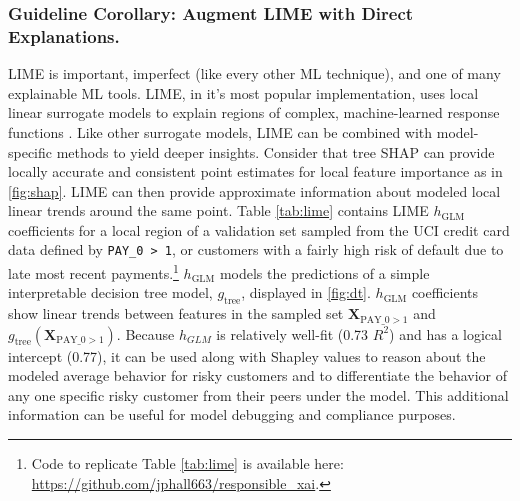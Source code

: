 \documentclass[fleqn]{article}
\begin{document}
\subsubsection{Guideline Corollary: Augment LIME with Direct Explanations.} LIME is important, imperfect (like every other ML technique), and one of many explainable ML tools. LIME, in it's most popular implementation, uses local linear surrogate models to explain regions of complex, machine-learned response functions \cite{lime}. Like other surrogate models, LIME can be combined with model-specific methods to yield deeper insights. Consider that tree SHAP can provide locally accurate and consistent point estimates for local feature importance as in \ref{fig:shap}. LIME can then provide approximate information about modeled local linear trends around the same point. Table \ref{tab:lime} contains LIME $h_{\text{GLM}}$ coefficients for a local region of a validation set sampled from the UCI credit card data defined by \texttt{PAY\_0 > 1}, or customers with a fairly high risk of default due to late most recent payments.\footnote{Code to replicate Table \ref{tab:lime} is available here: \url{https://github.com/jphall663/responsible_xai}.} $h_{\text{GLM}}$ models the predictions of a simple interpretable decision tree model, $g_{\text{tree}}$, displayed in \ref{fig:dt}. $h_{\text{GLM}}$ coefficients show linear trends between features in the sampled set $\mathbf{X}_{\text{PAY\_0} > 1}$ and $g_{\text{tree}}(\mathbf{X}_{\text{PAY\_0}> 1})$. Because $h_{GLM}$ is relatively well-fit (0.73 $R^2$) and has a logical intercept (0.77), it can be used along with Shapley values to reason about the modeled average behavior for risky customers and to differentiate the behavior of any one specific risky customer from their peers under the model. This additional information can be useful for model debugging and compliance purposes.
\end{document}
